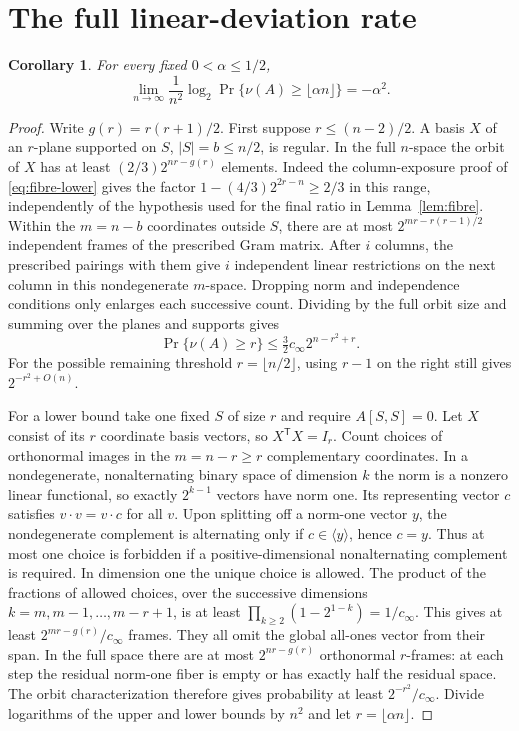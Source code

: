 \documentclass[11pt]{article}
\newtheorem{corollary}[theorem]{Corollary}
\theoremstyle{remark}\newtheorem*{remark}{Remark}
\begin{document}
\section{The full linear-deviation rate}
\begin{corollary}\label{cor:linear}
For every fixed $0<\alpha\le1/2$,
\[
 \lim_{n\to\infty}\frac{1}{n^2}\log_2\Pr\{\nu(A)\ge\lfloor\alpha n\rfloor\}=-\alpha^2 .
\]
\end{corollary}
\begin{proof}
Write $g(r)=r(r+1)/2$. First suppose $r\le(n-2)/2$. A basis $X$ of an $r$-plane supported on $S$, $|S|=b\le n/2$, is regular. In the full $n$-space the orbit of $X$ has at least $(2/3)2^{nr-g(r)}$ elements. Indeed the column-exposure proof of \eqref{eq:fibre-lower} gives the factor $1-(4/3)2^{2r-n}\ge2/3$ in this range, independently of the hypothesis used for the final ratio in Lemma~\ref{lem:fibre}. Within the $m=n-b$ coordinates outside $S$, there are at most $2^{mr-r(r-1)/2}$ independent frames of the prescribed Gram matrix. After $i$ columns, the prescribed pairings with them give $i$ independent linear restrictions on the next column in this nondegenerate $m$-space. Dropping norm and independence conditions only enlarges each successive count. Dividing by the full orbit size and summing over the planes and supports gives
\[
 \Pr\{\nu(A)\ge r\}\le \tfrac32 c_\infty 2^{n-r^2+r}.
\]
For the possible remaining threshold $r=\lfloor n/2\rfloor$, using $r-1$ on the right still gives $2^{-r^2+O(n)}$.

For a lower bound take one fixed $S$ of size $r$ and require $A[S,S]=0$. Let $X$ consist of its $r$ coordinate basis vectors, so $X^{\mathsf T}X=I_r$. Count choices of orthonormal images in the $m=n-r\ge r$ complementary coordinates. In a nondegenerate, nonalternating binary space of dimension $k$ the norm is a nonzero linear functional, so exactly $2^{k-1}$ vectors have norm one. Its representing vector $c$ satisfies $v\cdot v=v\cdot c$ for all $v$. Upon splitting off a norm-one vector $y$, the nondegenerate complement is alternating only if $c\in\langle y\rangle$, hence $c=y$. Thus at most one choice is forbidden if a positive-dimensional nonalternating complement is required. In dimension one the unique choice is allowed. The product of the fractions of allowed choices, over the successive dimensions $k=m,m-1,\ldots,m-r+1$, is at least $\prod_{k\ge2}(1-2^{1-k})=1/c_\infty$. This gives at least $2^{mr-g(r)}/c_\infty$ frames. They all omit the global all-ones vector from their span. In the full space there are at most $2^{nr-g(r)}$ orthonormal $r$-frames: at each step the residual norm-one fiber is empty or has exactly half the residual space. The orbit characterization therefore gives probability at least $2^{-r^2}/c_\infty$. Divide logarithms of the upper and lower bounds by $n^2$ and let $r=\lfloor\alpha n\rfloor$.
\end{proof}
\end{document}
